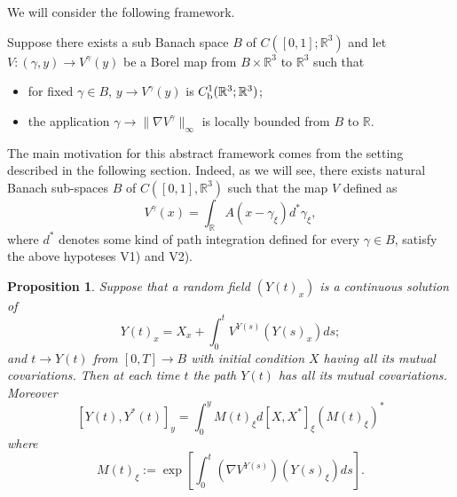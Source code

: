 \documentclass[a4paper,12pt,reqno]{amsart}
\newcommand{\R}{\mathbb{R}}
\newtheorem{proposition}{Proposition}
\begin{document}
We will consider the following framework.
 
Suppose there exists a sub Banach space $B$ of  $C([0,1];\R^3)$
and let $V : (\gamma, y) \rightarrow V^\gamma (y)$
 be  a Borel map 
from $B  \times  \R^3$ to $\R^3$ such that 
\begin{itemize} \label{Ass}
\item[V1)] for fixed $ \gamma \in B  $,
$ y \rightarrow V^\gamma (y)$   is $C^1_{\rm b} (\R^3; \R^3 )$;
\item[V2)] the application
$\gamma  \rightarrow \|\nabla V ^\gamma\|_\infty$   is locally bounded from
$B$ to $\R$.
\end{itemize} 

The main motivation for this abstract framework comes from the setting
described in the following section. Indeed, as we will see, there
exists natural Banach sub-spaces $B$ of $C([0,1],\R^3)$ such that the map
$V$ defined as
$$ V^\gamma(x) = \int_ \R A(x - \gamma_\xi) d^* \gamma_\xi,  $$
where $d^*$ denotes some kind of path integration defined for every
$\gamma \in B$, satisfy the above hypoteses V1) and V2). 

\begin{proposition} \label{PQVar} 
Suppose that a random field $(Y(t)_x)$ is a continuous solution of
\begin{equation} \label{EQVar}
 Y(t)_x = X_x + \int_0^t V^{Y(s)} (Y(s)_x) ds; 
\end{equation}
 and $t \rightarrow Y(t)$     from $ [0,T] \rightarrow B$  with
  initial condition $X$ having all its mutual covariations.
Then at each time $t$ the path $Y(t)$ has all its mutual covariations.
Moreover
\begin{equation}
  \label{eq:EQVar2}
[Y(t), Y^*(t)]_y  =   \int_0^y  M(t)_\xi  d[X,X^*]_\xi (M(t)_\xi)^*  
\end{equation}
where
\begin{equation}
  \label{eq:Mprocess}
M(t)_\xi := \exp \left[\int_0^t
(\nabla V^{Y(s)})(Y(s)_\xi) ds \right].  
\end{equation}
\end{proposition}
\end{document}
